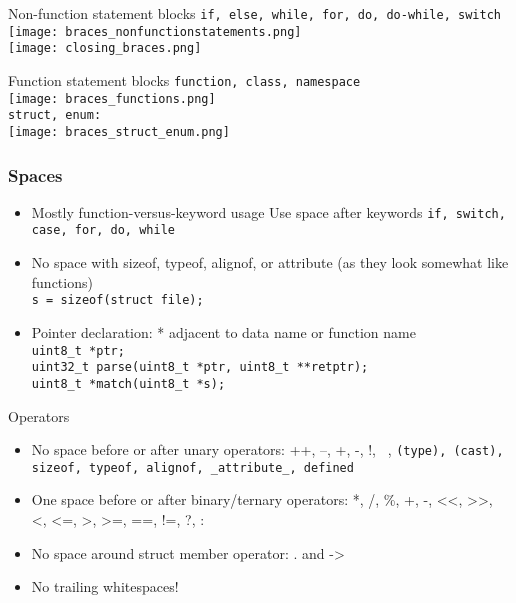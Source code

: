 
\begin{definition}{Non-function statement blocks}
    \texttt{if, else, while, for, do, do-while, switch}
    \\
    \texttt{[image: braces\_nonfunctionstatements.png]}
    \\
    \texttt{[image: closing\_braces.png]}
\end{definition}

\begin{definition}{Function statement blocks}
    \texttt{function, class, namespace}
    \\
    \texttt{[image: braces\_functions.png]}
    \\
    \texttt{struct, enum:}
    \\
    \texttt{[image: braces\_struct\_enum.png]}
\end{definition}

\multend

\subsubsection{Spaces}


\begin{remark}
    \begin{itemize}
    \item Mostly function-versus-keyword usage Use space after keywords
    \texttt{if, switch, case, for, do, while}
    \item No space with sizeof, typeof, alignof, or attribute (as they look somewhat like functions)
    \\ \texttt{s = sizeof(struct file);}
    \item Pointer declaration: * adjacent to data name or function name
    \\ \texttt{uint8\_t *ptr;}
    \\ \texttt{uint32\_t parse(uint8\_t *ptr, uint8\_t **retptr);}
    \\ \texttt{uint8\_t *match(uint8\_t *s);}
    \end{itemize}
\end{remark}

\begin{definition}{Operators}
    \begin{itemize}
        \item No space before or after unary operators: ++, --, +, -, !, ~, \texttt{(type), (cast), sizeof, typeof, alignof, \_attribute\_, defined}
        \item One space before or after binary/ternary operators: *, /, \%, +, -, <<, >>, <, <=, >, >=, ==, !=, ?, :
        \item No space around struct member operator: . and ->
        \item No trailing whitespaces!
    \end{itemize}
\end{definition}

